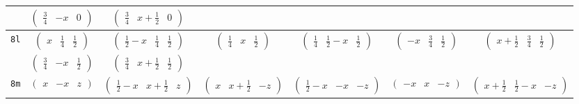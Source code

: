\documentclass[fleqn,9pt,landscape]{jsarticle}
\begin{document}
\begin{center}
\begin{longtable}{ccccccc}
& $ \begin{pmatrix} \frac{3}{4} & - x & 0 \end{pmatrix} $ & $ \begin{pmatrix} \frac{3}{4} & x + \frac{1}{2} & 0 \end{pmatrix} $ & $  $ & $  $ & $  $ & $  $ \\ \hline
{\tt 8l} & $ \begin{pmatrix} x & \frac{1}{4} & \frac{1}{2} \end{pmatrix} $ & $ \begin{pmatrix} \frac{1}{2} - x & \frac{1}{4} & \frac{1}{2} \end{pmatrix} $ & $ \begin{pmatrix} \frac{1}{4} & x & \frac{1}{2} \end{pmatrix} $ & $ \begin{pmatrix} \frac{1}{4} & \frac{1}{2} - x & \frac{1}{2} \end{pmatrix} $ & $ \begin{pmatrix} - x & \frac{3}{4} & \frac{1}{2} \end{pmatrix} $ & $ \begin{pmatrix} x + \frac{1}{2} & \frac{3}{4} & \frac{1}{2} \end{pmatrix} $ \\
& $ \begin{pmatrix} \frac{3}{4} & - x & \frac{1}{2} \end{pmatrix} $ & $ \begin{pmatrix} \frac{3}{4} & x + \frac{1}{2} & \frac{1}{2} \end{pmatrix} $ & $  $ & $  $ & $  $ & $  $ \\ \hline
{\tt 8m} & $ \begin{pmatrix} x & - x & z \end{pmatrix} $ & $ \begin{pmatrix} \frac{1}{2} - x & x + \frac{1}{2} & z \end{pmatrix} $ & $ \begin{pmatrix} x & x + \frac{1}{2} & - z \end{pmatrix} $ & $ \begin{pmatrix} \frac{1}{2} - x & - x & - z \end{pmatrix} $ & $ \begin{pmatrix} - x & x & - z \end{pmatrix} $ & $ \begin{pmatrix} x + \frac{1}{2} & \frac{1}{2} - x & - z \end{pmatrix} $ \\

\end{longtable}
\end{center}
\end{document}
